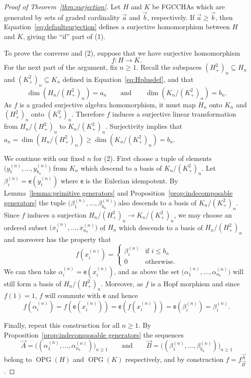 \documentclass[11pt]{amsart}
\theoremstyle{definition}
\numberwithin{equation}{section}
\newcommand{\FGCCHAs}{\textsf{FGCCHA}s\xspace}
\newcommand{\OPG}{\operatorname{OPG}}
\begin{document}
\begin{proof}[Proof of Theorem~\ref{thm:surjection}]
Let $H$ and $K$ be \FGCCHAs which are generated by sets of graded cardinality $\vec{a}$ and $\vec{b}$, respectively.  
If $\vec{a} \ge \vec{b}$, then Equation~\eqref{eq:defaultsurjection} defines a surjective homomorphism between $H$ and $K$, giving the ``if'' part of (1).

To prove the converse and (2), suppose that we have surjective homomorphism
\[
f: H \to K.
\]
For the next part of the argument, fix $n \ge 1$.  
Recall the subspaces $(H_{+}^{2})_{n} \subseteq H_{n}$ and $(K_{+}^{2})_{n} \subseteq K_{n}$ defined in Equation~\eqref{eq:Hplusdef}, and that 
\[
\dim(H_{n} / (H^{2}_{+})_{n}) = a_{n}
\qquad\text{and}\qquad
\dim(K_{n} / (K^{2}_{+})_{n}) = b_{n}.
\]
As $f$ is a graded surjective algebra homomorphism, it must map $H_{n}$ onto $K_{n}$ and $(H^{2}_{+})_{n}$ onto $(K^{2}_{+})_{n}$.  
Therefore $f$ induces a surjective linear transformation from $H_{n} / (H_{+}^{2})_{n}$ to $K_{n} / (K_{+}^{2})_{n}$.  
Surjectivity implies that $a_{n} = \dim(H_{n} / (H_{+}^{2})_{n}) \ge \dim(K_{n} / (K_{+}^{2})_{n})  = b_{n}$.


We continue with our fixed $n$ for (2).  
First choose a tuple of elements $\big( y^{(n)}_{1}, \ldots, y^{(n)}_{b_{n}} \big)$ from $K_{n}$ which descend to a basis of $K_{n} / (K_{+}^{2})_{n}$.
Let $\beta_{i}^{(n)} = \mathsf{e}(y_{i}^{(n)})$ where $\mathsf{e}$ is the 
Eulerian idempotent. 
By Lemma~\ref{lemma:primitive generators} and Proposition~\ref{prop:indecomposable generators} the tuple $\big( \beta^{(n)}_{1}, \ldots, \beta^{(n)}_{b_{n}} \big)$ also descends to a basis of $K_{n} / (K^{2}_{+})_{n}$.  
Since $f$ induces a surjection $H_{n} / (H^{2}_{+})_{n} \to K_{n} / (K^{2}_{+})_{n}$, we may choose an ordered subset $\big( x^{(n)}_{1}, \ldots, x^{(n)}_{a_{n}} \big)$ of $H_{n}$ which descends to a basis of $H_{n}/(H^{2}_{+})_{n}$ and moreover has the property that
\[
f(x^{(n)}_{i}) = \begin{cases} \beta^{(n)}_{i} & \text{if $i \le b_{n}$} \\ 0 & \text{otherwise.} \end{cases}
\]
We can then take $\alpha_{i}^{(n)} = \mathsf{e}(x_{i}^{(n)})$, and as above the set $\big( \alpha^{(n)}_{1}, \ldots, \alpha^{(n)}_{a_{n}} \big)$ will still form a basis of $H_{n} / (H^{2}_{+})_{n}$.
Moreover, as $f$ is a Hopf morphism and since $f(1) = 1$, $f$ will commute with $\mathsf{e}$ and hence
\[
f(\alpha_{i}^{(n)}) = f( \mathsf{e}(x_{i}^{(n)})) = \mathsf{e}(f( x_{i}^{(n)})) = \mathsf{e}(\beta_{i}^{(n)}) = \beta_{i}^{(n)}.
\]

Finally, repeat this construction for all $n \ge 1$.  By Proposition~\ref{prop:indecomposable generators} the sequences 
\[
\vec{A} = \big( (\alpha_{1}^{(n)}, \ldots, \alpha_{a_{n}}^{(n)}) \big)_{n \ge 1}
\qquad\text{and}\qquad
\vec{B} = \big( (\beta_{1}^{(n)}, \ldots, \beta_{b_{n}}^{(n)}) \big)_{n \ge 1}
\]
belong to $\OPG(H)$ and $\OPG(K)$ respectively, and by construction $f = f^{\vec{A}}_{\vec{B}}$.
\end{proof}
\end{document}
